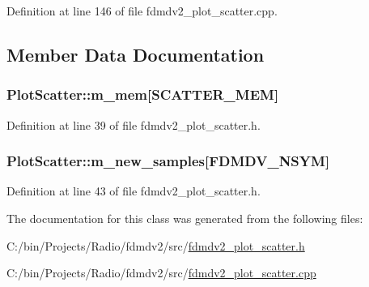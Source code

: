 Definition at line 146 of file fdmdv2\-\_\-plot\-\_\-scatter.\-cpp.



\subsection{Member Data Documentation}
\hypertarget{class_plot_scatter_ab0c0683c27bb137bc7bb04aff7de88ab}{
\subsubsection[{m\-\_\-mem}]{ Plot\-Scatter\-::m\-\_\-mem\mbox{[}{\bf S\-C\-A\-T\-T\-E\-R\-\_\-\-M\-E\-M}\mbox{]}\hspace{0.3cm}{\ttfamily [protected]}}}\label{class_plot_scatter_ab0c0683c27bb137bc7bb04aff7de88ab}


Definition at line 39 of file fdmdv2\-\_\-plot\-\_\-scatter.\-h.

\hypertarget{class_plot_scatter_a54ec91bd3e57b7648b1ee225de414993}{
\subsubsection[{m\-\_\-new\-\_\-samples}]{ Plot\-Scatter\-::m\-\_\-new\-\_\-samples\mbox{[}F\-D\-M\-D\-V\-\_\-\-N\-S\-Y\-M\mbox{]}\hspace{0.3cm}{\ttfamily [protected]}}}\label{class_plot_scatter_a54ec91bd3e57b7648b1ee225de414993}


Definition at line 43 of file fdmdv2\-\_\-plot\-\_\-scatter.\-h.



The documentation for this class was generated from the following files\-:\begin{DoxyCompactItemize}
\item 
C\-:/bin/\-Projects/\-Radio/fdmdv2/src/\hyperlink{fdmdv2__plot__scatter_8h}{fdmdv2\-\_\-plot\-\_\-scatter.\-h}\item 
C\-:/bin/\-Projects/\-Radio/fdmdv2/src/\hyperlink{fdmdv2__plot__scatter_8cpp}{fdmdv2\-\_\-plot\-\_\-scatter.\-cpp}\end{DoxyCompactItemize}
